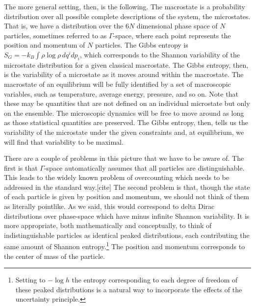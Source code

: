 \documentclass{article}
\begin{document}
The more general setting, then, is the following. The macrostate is a probability distribution over all possible complete descriptions of the system, the microstates. That is, we have a distribution over the $6N$ dimensional phase space of $N$ particles, sometimes referred to as $\Gamma$-space, where each point represents the position and momentum of $N$ particles. The Gibbs entropy is $S_G = -k_B \int \rho \log \rho \, dq^idp_i$, which corresponds to the Shannon variability of the microstate distribution for a given classical macrostate. The Gibbs entropy, then, is the variability of a microstate as it moves around within the macrostate. The macrostate of an equilibrium will be fully identified by a set of macroscopic variables, such as temperature, average energy, pressure, and so on. Note that these may be quantities that are not defined on an individual microstate but only on the ensemble. The microscopic dynamics will be free to move around as long as those statistical quantities are preserved. The Gibbs entropy, then, tells us the variability of the microstate under the given constraints and, at equilibrium, we will find that variability to be maximal.

There are a couple of problems in this picture that we have to be aware of. The first is that $\Gamma$-space automatically assumes that all particles are distinguishable. This leads to the widely known problem of overcounting which needs to be addressed in the standard way.[cite] The second problem is that, though the state of each particle is given by position and momentum, we should not think of them as literally pointlike. As we said, this would correspond to delta Dirac distributions over phase-space which have minus infinite Shannon variability. It is more appropriate, both mathematically and conceptually, to think of indistinguishable particles as identical peaked distributions, each contributing the same amount of Shannon entropy.\footnote{Setting to $-\log h$ the entropy corresponding to each degree of freedom of these peaked distributions is a natural way to incorporate the effects of the uncertainty principle.} The position and momentum corresponds to the center of mass of the particle.
\end{document}
